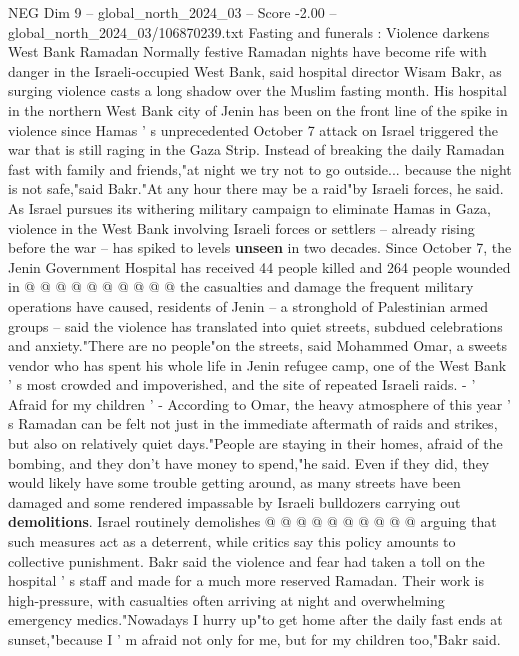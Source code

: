 \begin{textsample}{NEG Dim 9 – global\_north\_2024\_03 – Score -2.00 – global\_north\_2024\_03/106870239.txt}  \label{ex:f9_neg_179}
Fasting and funerals : Violence darkens West Bank Ramadan Normally festive Ramadan nights have become rife with danger in the Israeli-occupied West Bank, said hospital director Wisam Bakr, as surging violence casts a long shadow over the Muslim fasting month.
His hospital in the northern West Bank city of Jenin has been on the front line of the spike in violence since Hamas ' s unprecedented October 7 attack on Israel triggered the war that is still raging in the Gaza Strip.
Instead of breaking the daily Ramadan fast with family and friends,"at night we try not to go outside... because the night is not safe,"said Bakr."At any hour there may be a raid"by Israeli forces, he said.
As Israel pursues its withering military campaign to eliminate Hamas in Gaza, violence in the West Bank involving Israeli forces or settlers -- already rising before the war -- has spiked to levels \textbf{unseen} in two decades.
Since October 7, the Jenin Government Hospital has received 44 people killed and 264 people wounded in @ @ @ @ @ @ @ @ @ @ the casualties and damage the frequent military operations have caused, residents of Jenin -- a stronghold of Palestinian armed groups -- said the violence has translated into quiet streets, subdued celebrations and anxiety."There are no people"on the streets, said Mohammed Omar, a sweets vendor who has spent his whole life in Jenin refugee camp, one of the West Bank ' s most crowded and impoverished, and the site of repeated Israeli raids. - ' Afraid for my children ' - According to Omar, the heavy atmosphere of this year ' s Ramadan can be felt not just in the immediate aftermath of raids and strikes, but also on relatively quiet days."People are staying in their homes, afraid of the bombing, and they don't have money to spend,"he said.
Even if they did, they would likely have some trouble getting around, as many streets have been damaged and some rendered impassable by Israeli bulldozers carrying out \textbf{demolitions}.
Israel routinely demolishes @ @ @ @ @ @ @ @ @ @ arguing that such measures act as a deterrent, while critics say this policy amounts to collective punishment.
Bakr said the violence and fear had taken a toll on the hospital ' s staff and made for a much more reserved Ramadan.
Their work is high-pressure, with casualties often arriving at night and overwhelming emergency medics."Nowadays I hurry up"to get home after the daily fast ends at sunset,"because I ' m afraid not only for me, but for my children too,"Bakr said.

\end{textsample}
